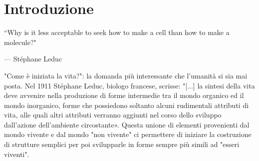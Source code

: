 
\chapter{Introduzione}
\vspace{0.5cm}

\label{cha:intro}
\epigraph{“Why is it less acceptable to seek how to make a cell than how to make a molecule?"}{--- \textup{Stéphane Leduc}}

"Come è iniziata la vita?": la domanda più interessante che l'umanità si sia mai posta. 
Nel 1911 Stéphane Leduc, biologo francese, scrisse: "[...] la sintesi della vita deve avvenire nella produzione di forme intermedie tra il mondo organico ed il mondo inorganico, forme che possiedono soltanto alcuni rudimentali attributi di vita, alle quali altri attributi verranno aggiunti nel corso dello sviluppo dall'azione dell'ambiente circostante». 
Questa unione di elementi provenienti dal mondo vivente e dal mondo "non vivente" ci permettere di iniziare la costruzione di strutture semplici per poi svilupparle in forme sempre più simili ad "esseri viventi". 


